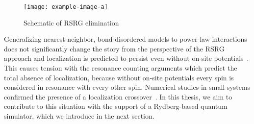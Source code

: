 \begin{figure}[htb]
	\centering
	\texttt{[image: example-image-a]}
	\caption{Schematic of RSRG elimination}
\end{figure}

Generalizing nearest-neighbor, bond-disordered models to power-law interactions does not significantly change the story from the perspective of the RSRG approach and localization is predicted to persist even without on-site potentials~\cite{moureManyBodyLocalizationTransition2015,moureDisorderedQuantumSpin2018,kutlinRenormalizationLocalizationSmall2020}. This causes tension with the resonance counting arguments which predict the total absence of localization, because without on-site potentials every spin is considered in resonance with every other spin.
Numerical studies in small systems confirmed the presence of a localization crossover~\cite{mohdebEntanglementPropertiesDisordered2020,mohdebExcitedEigenstateEntanglementProperties2022,mohdebGlobalQuenchDynamics2023}. 
In this thesis, we aim to contribute to this situation with the support of a Rydberg-based quantum simulator, which we introduce in the next section.
% 






